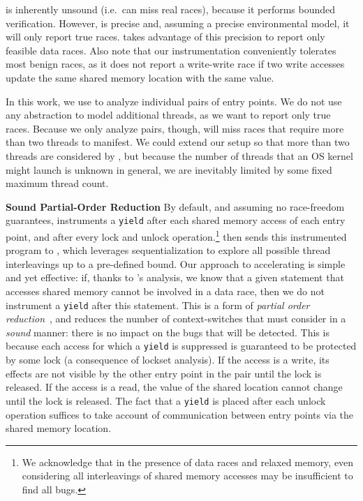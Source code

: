 \corral is inherently unsound (i.e.\ can miss real races), because it performs bounded verification. However, \corral is precise and, assuming a precise environmental model, it will only report true races. \whoop takes advantage of this precision to report only feasible data races. Also note that our instrumentation conveniently tolerates most benign races, as it does not report a write-write race if two write accesses update the same shared memory location with the same value.

In this work, we use \corral to analyze individual pairs of entry points. We do not use any abstraction to model additional threads, as we want \corral to report only true races. Because we only analyze pairs, though, \corral will miss races that require more than two threads to manifest. We could extend our setup so that more than two threads are considered by \corral, but because the number of threads that an OS kernel might launch is unknown in general, we are inevitably limited by some fixed maximum thread count.

\noindent\textbf{Sound Partial-Order Reduction }
%
By default, and assuming no race-freedom guarantees, \whoop instruments a \texttt{yield} after each shared memory access of each entry point, and after every lock and unlock operation.\footnote{We acknowledge that in the presence of data races and relaxed memory, even considering all interleavings of shared memory accesses may be insufficient to find all bugs.} \whoop then sends this instrumented program to \corral, which leverages sequentialization to explore all possible thread interleavings up to a pre-defined bound. Our approach to accelerating \corral is simple and yet effective: if, thanks to \whoop's analysis, we know that a given statement that accesses shared memory cannot be involved in a data race, then we do not instrument a \texttt{yield} after this statement.  This is a form of \emph{partial order reduction}~\cite{DBLP:books/sp/Godefroid96}, and reduces the number of context-switches that \corral must consider in a \emph{sound} manner: there is no impact on the bugs that will be detected.  This is because each access for which a \texttt{yield} is suppressed is guaranteed to be protected by some lock (a consequence of lockset analysis).  If the access is a write, its effects are not visible by the other entry point in the pair until the lock is released.  If the access is a read, the value of the shared location cannot change until the lock is released.  The fact that a \texttt{yield} is placed after each unlock operation suffices to take account of communication between entry points via the shared memory location.


